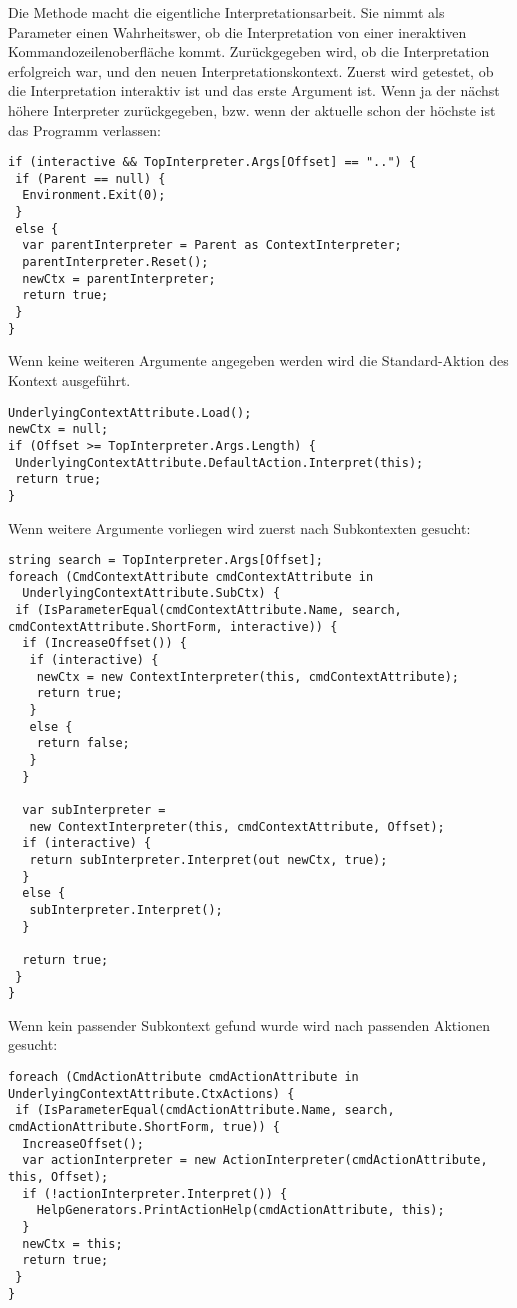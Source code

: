 Die  Methode macht die eigentliche Interpretationsarbeit.
Sie nimmt als Parameter einen Wahrheitswer, ob die Interpretation von einer ineraktiven Kommandozeilenoberfläche kommt.
Zurückgegeben wird, ob die Interpretation erfolgreich war, und den neuen Interpretationskontext.
Zuerst wird getestet, ob die Interpretation interaktiv ist und das erste Argument  ist.
Wenn ja der nächst höhere Interpreter zurückgegeben, bzw. wenn der aktuelle schon der höchste ist das Programm verlassen:
\begin{lstlisting}[title=""]
if (interactive && TopInterpreter.Args[Offset] == "..") {
 if (Parent == null) {
  Environment.Exit(0);
 }
 else {
  var parentInterpreter = Parent as ContextInterpreter;
  parentInterpreter.Reset();
  newCtx = parentInterpreter;
  return true;
 }
}
\end{lstlisting}
Wenn keine weiteren Argumente angegeben werden wird die Standard-Aktion des Kontext ausgeführt.
\begin{lstlisting}[title=""]
UnderlyingContextAttribute.Load();
newCtx = null;
if (Offset >= TopInterpreter.Args.Length) {
 UnderlyingContextAttribute.DefaultAction.Interpret(this);
 return true;
}
\end{lstlisting}
Wenn weitere Argumente vorliegen wird zuerst nach Subkontexten gesucht:
\begin{lstlisting}[title=""]
string search = TopInterpreter.Args[Offset];
foreach (CmdContextAttribute cmdContextAttribute in 
  UnderlyingContextAttribute.SubCtx) {
 if (IsParameterEqual(cmdContextAttribute.Name, search, cmdContextAttribute.ShortForm, interactive)) {
  if (IncreaseOffset()) {
   if (interactive) {
    newCtx = new ContextInterpreter(this, cmdContextAttribute);
    return true;
   }
   else {
    return false;
   }
  }

  var subInterpreter = 
   new ContextInterpreter(this, cmdContextAttribute, Offset);
  if (interactive) {
   return subInterpreter.Interpret(out newCtx, true);
  }
  else {
   subInterpreter.Interpret();
  }

  return true;
 }
}
\end{lstlisting}
Wenn kein passender Subkontext gefund wurde wird nach passenden Aktionen gesucht:
\begin{lstlisting}[title=""]
foreach (CmdActionAttribute cmdActionAttribute in UnderlyingContextAttribute.CtxActions) {
 if (IsParameterEqual(cmdActionAttribute.Name, search, cmdActionAttribute.ShortForm, true)) {
  IncreaseOffset();
  var actionInterpreter = new ActionInterpreter(cmdActionAttribute, this, Offset);
  if (!actionInterpreter.Interpret()) {
  	HelpGenerators.PrintActionHelp(cmdActionAttribute, this);
  }
  newCtx = this;
  return true;
 }
}
\end{lstlisting}
